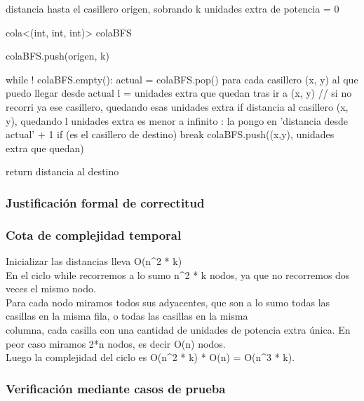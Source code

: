 \documentclass[11pt, a4paper, twoside]{article}
\begin{document}
distancia hasta el casillero origen, sobrando k unidades extra de potencia = 0

cola<(int, int, int)> colaBFS

colaBFS.push(origen, k)

while ! colaBFS.empty():
    actual = colaBFS.pop()
    para cada casillero (x, y) al que puedo llegar desde actual
        l = unidades extra que quedan tras ir a (x, y)
        // si no recorri ya ese casillero, quedando esas unidades extra
        if distancia al casillero (x, y), quedando l unidades extra es menor a infinito :
            la pongo en 'distancia desde actual' + 1
            if (es el casillero de destino) break
            colaBFS.push((x,y), unidades extra que quedan)

return distancia al destino




\subsubsection{Justificación formal de correctitud}

\subsubsection{Cota de complejidad temporal}
Inicializar las distancias lleva O(n^2 * k)\\
En el ciclo while recorremos a lo sumo n^2 * k nodos, ya que no recorremos dos veces el mismo nodo.\\
Para cada nodo miramos todos sus adyacentes, que son a lo sumo todas las casillas en la misma fila, o todas las casillas en la misma\\
columna, cada casilla con una cantidad de unidades de potencia extra única. En peor caso miramos 2*n nodos, es decir O(n) nodos.\\
Luego la complejidad del ciclo es O(n^2 * k) * O(n) = O(n^3 * k).\\




\subsubsection{Verificación mediante casos de prueba}
\end{document}
